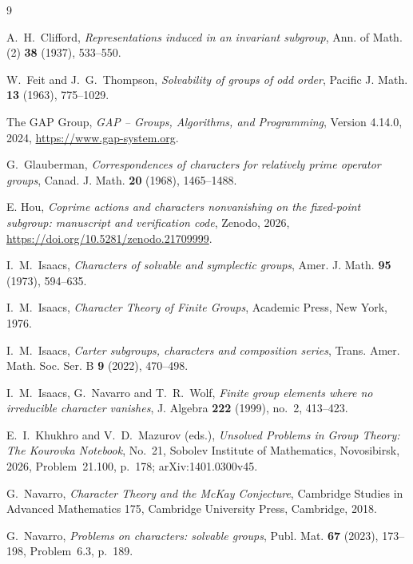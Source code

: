 \documentclass[11pt]{article}
\theoremstyle{definition}
\theoremstyle{remark}
\begin{document}
\begin{thebibliography}{9}

A.~H.~Clifford,
\emph{Representations induced in an invariant subgroup},
Ann. of Math. (2) \textbf{38} (1937), 533--550.

W.~Feit and J.~G.~Thompson,
\emph{Solvability of groups of odd order},
Pacific J. Math. \textbf{13} (1963), 775--1029.

The GAP Group,
\emph{GAP -- Groups, Algorithms, and Programming}, Version 4.14.0, 2024,
\url{https://www.gap-system.org}.

G.~Glauberman,
\emph{Correspondences of characters for relatively prime operator
groups},
Canad. J. Math. \textbf{20} (1968), 1465--1488.

E. Hou, \emph{Coprime actions and characters nonvanishing on the
fixed-point subgroup: manuscript and verification code}, Zenodo, 2026,
\url{https://doi.org/10.5281/zenodo.21709999}.

I.~M.~Isaacs,
\emph{Characters of solvable and symplectic groups},
Amer. J. Math. \textbf{95} (1973), 594--635.

I.~M.~Isaacs,
\emph{Character Theory of Finite Groups},
Academic Press, New York, 1976.

I.~M.~Isaacs,
\emph{Carter subgroups, characters and composition series},
Trans. Amer. Math. Soc. Ser. B \textbf{9} (2022), 470--498.

I.~M.~Isaacs, G.~Navarro and T.~R.~Wolf,
\emph{Finite group elements where no irreducible character vanishes},
J. Algebra \textbf{222} (1999), no.~2, 413--423.

E.~I.~Khukhro and V.~D.~Mazurov (eds.),
\emph{Unsolved Problems in Group Theory: The Kourovka Notebook},
No.~21, Sobolev Institute of Mathematics, Novosibirsk, 2026,
Problem~21.100, p.~178; arXiv:1401.0300v45.

G.~Navarro,
\emph{Character Theory and the McKay Conjecture},
Cambridge Studies in Advanced Mathematics 175,
Cambridge University Press, Cambridge, 2018.

G.~Navarro,
\emph{Problems on characters: solvable groups},
Publ. Mat. \textbf{67} (2023), 173--198,
Problem~6.3, p.~189.

\end{thebibliography}
\end{document}
